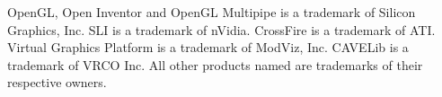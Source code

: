 \documentclass[10pt,a4paper]{scrartcl}
\begin{document}
\vfill
\begin{spacing}{.5}{\footnotesize
OpenGL, Open Inventor and OpenGL Multipipe is a trademark of Silicon
Graphics, Inc. SLI is a trademark of nVidia. CrossFire is a trademark of
ATI. Virtual Graphics Platform is a trademark of ModViz, Inc. CAVELib is
a trademark of VRCO Inc. All other products named are trademarks of
their respective owners.
}\end{spacing}
\end{document}
